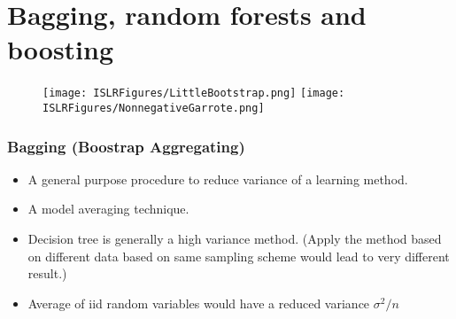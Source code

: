 \documentclass{beamer}
\begin{document}
\section{Bagging, random forests and boosting}       

\begin{frame}{}

                \begin{figure}
                    \centering
                    
                    \centering
                    \texttt{[image: ISLRFigures/LittleBootstrap.png]}\quad
                    \texttt{[image: ISLRFigures/NonnegativeGarrote.png]}
                  \end{figure}

\end{frame}

                  \begin{frame}
                  	\frametitle{Bagging (Boostrap Aggregating)  }
                  	\begin{itemize}
                  		\item A general purpose procedure to reduce variance of a learning method.
                  		
                  		\item A model averaging technique.
                  		
                  		\item Decision tree is generally a high variance method. (Apply the method based on 
                  		different data based on same sampling scheme would lead to very different result.)
                  		 
                  	   \item Average of iid random variables would have a reduced variance $\sigma^2/n$
                  		
                  	\end{itemize}
                  \end{frame} 
               
\end{document}
